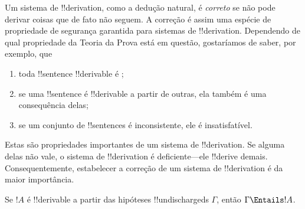 \documentclass[../../../include/open-logic-section]{subfiles}
\begin{document}
      {}
      {}
      

\begin{explain}
Um sistema de !!{derivation}, como a dedução natural, é \emph{correto}
se não pode derivar coisas que de fato não seguem.  A correção é
assim uma espécie de propriedade de segurança garantida para sistemas de
!!{derivation}. Dependendo de qual propriedade da Teoria da Prova está em
questão, gostaríamos de saber, por exemplo, que
\begin{enumerate}
\item toda !!{sentence} !!{derivable} é ;
\item se uma !!{sentence} é !!{derivable} a partir de outras, ela também é uma
  consequência delas;
\item se um conjunto de !!{sentence}s é inconsistente, ele é insatisfatível.
\end{enumerate}
Estas são propriedades importantes de um sistema de !!{derivation}. Se
alguma delas não vale, o sistema de !!{derivation} é deficiente---ele
!!{derive} demais.  Consequentemente, estabelecer a correção de um
sistema de !!{derivation} é da maior importância.
\end{explain}

\begin{thm}[Correção]
Se $!A$ é !!{derivable} a partir das hipóteses !!{undischarged}s
$\Gamma$, então $\Gamma \Entails !A$.
\end{thm}
\end{document}
